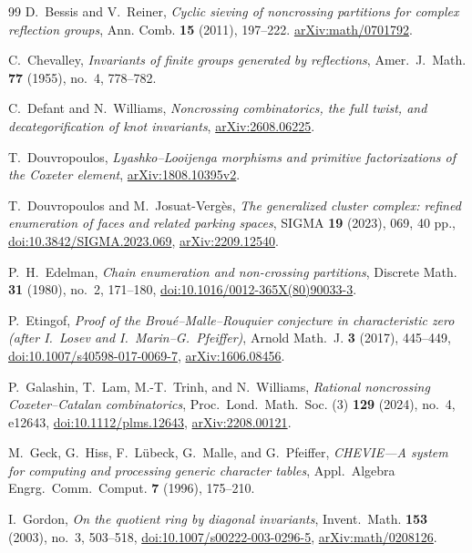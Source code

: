 \documentclass[10pt,a4paper]{amsart}
\theoremstyle{definition}
\begin{document}
\begin{thebibliography}{99}
D.~Bessis and V.~Reiner,
\emph{Cyclic sieving of noncrossing partitions for complex reflection groups},
Ann. Comb. \textbf{15} (2011), 197--222.
\href{https://arxiv.org/abs/math/0701792}{arXiv:math/0701792}.

C.~Chevalley, \emph{Invariants of finite groups generated by reflections},
Amer.~J.~Math. \textbf{77} (1955), no.~4, 778--782.

C.~Defant and N.~Williams,
\emph{Noncrossing combinatorics, the full twist, and decategorification
of knot invariants},
\href{https://arxiv.org/abs/2608.06225}{arXiv:2608.06225}.

T.~Douvropoulos,
\emph{Lyashko--Looijenga morphisms and primitive factorizations of the Coxeter element},
\href{https://arxiv.org/abs/1808.10395v2}{arXiv:1808.10395v2}.

T.~Douvropoulos and M.~Josuat-Verg\`es,
\emph{The generalized cluster complex: refined enumeration of faces
and related parking spaces},
SIGMA \textbf{19} (2023), 069, 40 pp.,
\href{https://doi.org/10.3842/SIGMA.2023.069}{doi:10.3842/SIGMA.2023.069},
\href{https://arxiv.org/abs/2209.12540}{arXiv:2209.12540}.

P.~H.~Edelman,
\emph{Chain enumeration and non-crossing partitions},
Discrete Math. \textbf{31} (1980), no.~2, 171--180,
\href{https://doi.org/10.1016/0012-365X(80)90033-3}{doi:10.1016/0012-365X(80)90033-3}.

P.~Etingof,
\emph{Proof of the Brou\'e--Malle--Rouquier conjecture in characteristic zero
(after I.~Losev and I.~Marin--G.~Pfeiffer)},
Arnold Math.~J. \textbf{3} (2017), 445--449,
\href{https://doi.org/10.1007/s40598-017-0069-7}{doi:10.1007/s40598-017-0069-7},
\href{https://arxiv.org/abs/1606.08456}{arXiv:1606.08456}.

P.~Galashin, T.~Lam, M.-T.~Trinh, and N.~Williams,
\emph{Rational noncrossing Coxeter--Catalan combinatorics},
Proc.~Lond.~Math.~Soc. (3) \textbf{129} (2024), no.~4, e12643,
\href{https://doi.org/10.1112/plms.12643}{doi:10.1112/plms.12643},
\href{https://arxiv.org/abs/2208.00121}{arXiv:2208.00121}.

M.~Geck, G.~Hiss, F.~L\"ubeck, G.~Malle, and G.~Pfeiffer,
\emph{CHEVIE---A system for computing and processing generic character tables},
Appl.~Algebra Engrg.~Comm.~Comput. \textbf{7} (1996), 175--210.

I.~Gordon,
\emph{On the quotient ring by diagonal invariants},
Invent.~Math. \textbf{153} (2003), no.~3, 503--518,
\href{https://doi.org/10.1007/s00222-003-0296-5}{doi:10.1007/s00222-003-0296-5},
\href{https://arxiv.org/abs/math/0208126}{arXiv:math/0208126}.


\end{thebibliography}
\end{document}

